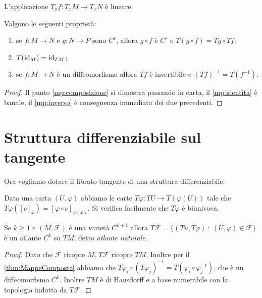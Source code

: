 \begin{remark}
	L'applicazione $T_xf:T_xM\to T_xN$ è lineare.
\end{remark}
 
\begin{theorem} \label{thm:MappeComposte} 
	Valgono le seguenti proprietà:
	\begin{enumerate}
	\item se $f:M\to N$ e $g:N\to P$ sono $C^r$, allora $g\circ f$ è $C^r$ e $T(g\circ f)=Tg\circ Tf$; \label{mp:composizione}
	\item $T(\mathrm{id}_M)=\mathrm{id}_{TM}$; \label{mp:identita}
	\item se $f:M\to N$ è un diffeomorfismo allora $Tf$ è invertibile e $(Tf)^{-1}=T(f^{-1})$. \label{mp:inverso}
	\end{enumerate}
\end{theorem}

\begin{proof}
	Il punto \ref{mp:composizione} si dimostra passando in carta, il \ref{mp:identita} è banale, il \ref{mp:inverso} è conseguenza immediata dei due precedenti.
\end{proof}

\section{Struttura differenziabile sul tangente}
Ora vogliamo dotare il fibrato tangente di una struttura differenziabile.
 
Data una carta $(U,\varphi)$ abbiamo le carte $T\varphi:TU\to T(\varphi(U))$ tale che $T\varphi([c]_x)=[\varphi\circ c]_{\varphi(x)}$. Si verifica facilmente che $T\varphi$ è biunivoca.
 
\begin{proposition} 
	Se $k\ge 1$ e $(M,\mathcal F)$ è una varietà $C^{k+1}$ allora $T\mathcal F=\{(Tu,T\varphi)\ :\ (U,\varphi)\in\mathcal F\}$ è un atlante $C^k$ su $TM$, detto \emph{atlante naturale}.
\end{proposition}

\begin{proof}
	Dato che $\mathcal F$ ricopre $M$, $T\mathcal F$ ricopre $TM$. Inoltre per il \cref{thm:MappeComposte} abbiamo che  $T\varphi_i\circ(T\varphi_j)^{-1}=T(\varphi_i\circ\varphi_j^{-1})$, che è un diffeomorfismo $C^k$.
	Inoltre $TM$ è di Hausdorff e a base numerabile con la topologia indotta da $T\mathcal F$.
\end{proof}


